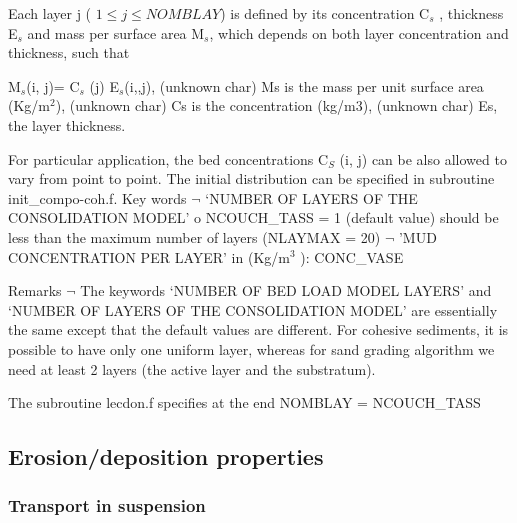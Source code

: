 Each layer j ( $1\leq j\leq NOMBLAY$) is defined by its concentration C$_{s}$%
, thickness E$_{s}$ and mass per surface area M$_{s}$, which depends on both
layer concentration and thickness, such that

M$_{s}$(i, j)= C$_{s}$ (j) E$_{s}$(i,,j),\newline
(unknown char)\hspace{5mm} Ms is the mass per unit surface area (Kg/m$^{2}$),%
\newline
(unknown char)\hspace{5mm} Cs is the concentration (kg/m3),\newline
(unknown char)\hspace{5mm} Es, the layer thickness.

For particular application, the bed concentrations C$_{S}$ (i, j) can be
also allowed to vary from point to point. The initial distribution can be
specified in subroutine init\_compo-coh.f. \newline
Key words\newline
$\neg$\hspace{5mm} `NUMBER OF LAYERS OF THE CONSOLIDATION MODEL' \newline
o\hspace{5mm} NCOUCH\_TASS = 1 (default value) should be less than the
maximum number of layers (NLAYMAX = 20)\newline
$\neg$\hspace{5mm} 'MUD CONCENTRATION PER LAYER' in (Kg/m$^{3}$ ): CONC\_VASE

Remarks\newline
$\neg$\hspace{5mm} The keywords `NUMBER OF BED LOAD MODEL LAYERS' and
`NUMBER OF LAYERS OF THE CONSOLIDATION MODEL' are essentially the same
except that the default values are different. For cohesive sediments, it is
possible to have only one uniform layer, whereas for sand grading algorithm
we need at least 2 layers (the active layer and the substratum).

The subroutine lecdon.f specifies at the end NOMBLAY = NCOUCH\_TASS\newline

\subsection{Erosion/deposition properties}

\subsubsection{Transport in suspension}

